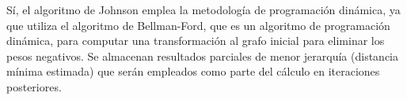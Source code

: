 \documentclass[../tp2_grupo404.tex]{subfiles}
\begin{document}
Sí, el algoritmo de Johnson emplea la metodología de programación
dinámica, ya que utiliza el algoritmo de Bellman-Ford, que es un
algoritmo de programación dinámica, para computar una transformación
al grafo inicial para eliminar los pesos negativos.
Se almacenan resultados parciales de menor jerarquía
(distancia mínima estimada) que serán empleados como parte del cálculo en iteraciones posteriores.

\end{document}
